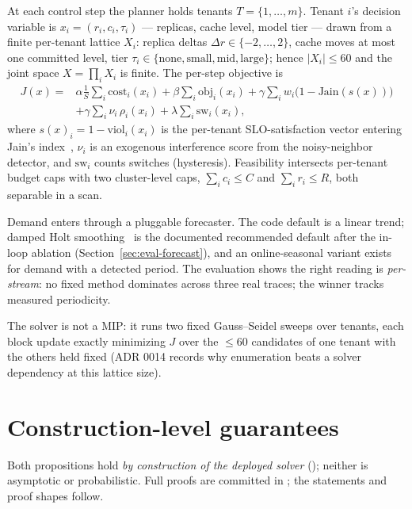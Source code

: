 At each control step the planner holds tenants $T=\{1,\dots,m\}$. Tenant
$i$'s decision variable is $x_i=(r_i,c_i,\tau_i)$ --- replicas, cache level,
model tier --- drawn from a finite per-tenant lattice $X_i$: replica deltas
$\Delta r\in\{-2,\dots,2\}$, cache moves at most one committed level, tier
$\tau_i\in\{\text{none},\text{small},\text{mid},\text{large}\}$; hence
$|X_i|\le 60$ and the joint space $X=\prod_i X_i$ is finite. The per-step
objective is
\begin{equation}
\label{eq:objective}
\begin{split}
J(x)={}&\alpha\frac{1}{S}\sum_{i}\mathrm{cost}_i(x_i)
      +\beta\sum_{i}\mathrm{obj}_i(x_i)
      +\gamma\sum_{i}w_i\bigl(1-\mathrm{Jain}(s(x))\bigr)\\
      &+\gamma\sum_i \nu_i\,\rho_i(x_i)
      +\lambda\sum_i \mathrm{sw}_i(x_i),
\end{split}
\end{equation}
where $s(x)_i = 1-\mathrm{viol}_i(x_i)$ is the per-tenant SLO-satisfaction
vector entering Jain's index~\citep{jain1984}, $\nu_i$ is an exogenous
interference score from the noisy-neighbor detector, and $\mathrm{sw}_i$
counts switches (hysteresis). Feasibility intersects per-tenant budget caps
with two cluster-level caps, $\sum_i c_i\le C$ and $\sum_i r_i\le R$, both
separable in a scan.

Demand enters through a pluggable forecaster. The code default is a linear
trend; damped Holt smoothing~\citep{holt2004} is the documented recommended
default after the in-loop ablation (Section~\ref{sec:eval-forecast}), and an
online-seasonal variant exists for demand with a detected period. The
evaluation shows the right reading is \emph{per-stream}: no fixed method
dominates across three real traces; the winner tracks measured periodicity.

The solver is not a MIP: it runs two fixed Gauss--Seidel sweeps over
tenants, each block update exactly minimizing $J$ over the $\le 60$
candidates of one tenant with the others held fixed (ADR 0014 records why
enumeration beats a solver dependency at this lattice size).

\section{Construction-level guarantees}
\label{sec:design-theory}

Both propositions hold \emph{by construction of the deployed solver}
(); neither is asymptotic or
probabilistic. Full proofs are committed in
; the statements and proof shapes
follow.

